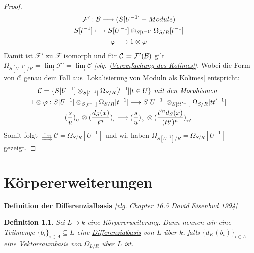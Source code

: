 \documentclass[10pt,a4paper]{report}
\newcommand{\comment}[1]{}
\newcommand{\ModulsOfDifferenzials}{David Eisenbud 1994}
\newcounter{Aussage}[chapter]
\newtheorem{definition}[Aussage]{Definition}
\newcommand{\functionfront}[3]{\nolinebreak{#1:#2 \longrightarrow #3}}
\newcommand{\divR}[2]{\Omega_{#1/#2}}
\newcommand{\divf}[1]{d_{#1}}
\newcommand{\Tensor}[3]{#1 \otimes_{#2} #3}
\newcommand{\tensor}[3]{#1 \otimes #3}
\newcommand{\lok}[2]{#1 [#2^{-1}]}
\newcommand{\loke}[3]{(\frac{#1}{#2})_{_{#3}}}
\newcommand{\colimes}[0]{\lim\limits_{ \longrightarrow }}
\newcommand*{\defeq}{\mathrel{\vcenter{\baselineskip0.5ex \lineskiplimit0pt
                     \hbox{\scriptsize.}\hbox{\scriptsize.}}}%
                     =}
\begin{document}
\begin{proof}
{\begin{gather*}
\functionfront{\mathcal{F'}}{\mathcal{B}}{(\lok{S}{U} - Module)}\\
\lok{S}{t} \longmapsto \Tensor{\lok{S}{U}}{\lok{S}{t}}{\lok{\divR{S}{R}}{t}}\\
\varphi \longmapsto \tensor{1}{\lok{S}{t}}{\varphi}
\end{gather*}}
Damit ist $\mathcal{F'}$ zu $\mathcal{F}$ isomorph und für $\mathcal{C} \defeq \mathcal{F'}(\mathcal{B})$ gilt $\divR{\lok{S}{U}}{R}  = \colimes{\mathcal{F'}} = \colimes{\mathcal{C}}$ \textit{[vlg. \cref{Vereinfachung des Kolimes}]}.
Wobei die Form von $\mathcal{C}$ genau dem Fall aus \cref{Lokalisierung von Moduln als Kolimes} entspricht:
\begin{gather*}
\comment{\divR{\lok{S}{U}}{R}  = \colimes{\mathcal{C}} \text{, wobei:} \\}
\mathcal{C} = \lbrace \Tensor{\lok{S}{U}}{\lok{S}{t}}{\lok{\divR{S}{R}}{t}} \vert t \in U \rbrace \textit{ mit den Morphismen }\\
\functionfront{\tensor{1}{\lok{S}{t}}{\varphi}}{\Tensor{\lok{S}{U}}{\lok{S}{t}}{\lok{\divR{S}{R}}{t}}}{\Tensor{\lok{S}{U}}{\lok{S}{tt'}}{\lok{\divR{S}{R}}{tt'}}} \\
\tensor{\loke{s}{u}{U}}{\lok{S}{t}}{\loke{\divf{S}(x)}{t^n}{t}} \longmapsto \tensor{\loke{s}{u}{U}}{\lok{S}{tt'}}{\loke{t'^n\divf{S}(x)}{(tt')^n}{tt'}}
\end{gather*}
Somit folgt $\colimes \mathcal{C} = \lok{\divR{S}{R}}{U}$ und wir haben $\divR{\lok{S}{U}}{R} = \lok{\divR{S}{R}}{U}$ gezeigt.
\end{proof}


\chapter{Körpererweiterungen}

\textbf{Definition der Differenzialbasis} \textit{[vlg. Chapter 16.5 \ModulsOfDifferenzials]}
\begin{definition}\comment{\label{Definition der Differenzialbasis}}
Sei $L \supset k$ eine Körpererweiterung. Dann nennen wir eine Teilmenge $\lbrace b_i \rbrace_{i \in \Lambda} \subseteq L$ eine \underline{Differenzialbasis} von $L$ über $k$, falls $\lbrace \divf{K}(b_i)\rbrace_{i \in \Lambda}$ eine Vektorraumbasis von $\divR{L}{R}$ über $L$ ist.
\end{definition}
\end{document}

